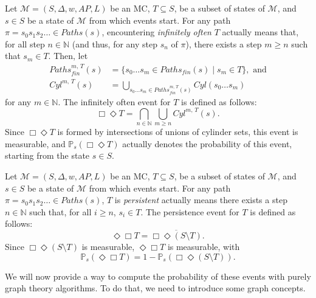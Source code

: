 \begin{definition}
  Let $\mathcal{M}=(S, \Delta, w, AP, L)$ be an MC, $T \subseteq S$, be a subset of states of $\mathcal{M}$, and
  $s \in S$ be a state of $\mathcal{M}$ from which events start. For any path $\pi = s_0 s_1 s_2 \dots \in Paths(s)$,
encountering \textit{infinitely often} $T$ actually means that, for all step $n \in \mathbb{N}$ (and thus, for any step $s_n$ of $\pi$), there exists a step $m \geq n$ such that $s_m \in T$. Then, let
  \begin{align*}
    Paths_{fin}^{m,\, T}(s) &= \{ s_0\dots s_m \in Paths_{fin}(s) \; | \; s_m \in T \}, \text{ and} \\
    Cyl^{m,\, T}(s) &= \bigcup_{s_0 \dots s_m \in Paths_{fin}^{m, \, T}(s)} Cyl(s_0\dots s_m)
  \end{align*}
  for any $m \in \mathbb{N}$. The infinitely often event for $T$ is defined as follows:
  \[
    \Box \Diamond T = \bigcap_{n \in \mathbb{N}} \bigcup_{m \geq n} Cyl^{m, \, T}(s).
  \]
  Since $\Box \Diamond T$ is formed by intersections of unions of cylinder sets, this event is measurable, and $\mathbb{P}_s(\Box\Diamond T)$ actually denotes the probability of this event, starting from the state $s \in S$.
\end{definition}

\begin{definition}
  Let $\mathcal{M}=(S, \Delta, w, AP, L)$ be an MC, $T \subseteq S$, be a subset of states of $\mathcal{M}$, and
  $s \in S$ be a state of $\mathcal{M}$ from which events start. For any path $\pi = s_0 s_1 s_2 \dots \in Paths(s)$,
 $T$ is \textit{persistent} actually means there exists a step $n \in \mathbb{N}$ such that, for all $i\geq n$, $s_i \in T$. The persistence event for $T$ is defined as follows:
 \[
  \Diamond \Box T = \overline{\Box \Diamond (S \setminus T)}.
 \]
 Since $\Box \Diamond (S \setminus T)$ is measurable, $\Diamond \Box T$ is measurable, with \[\mathbb{P}_s(\Diamond \Box T) = 1 - \mathbb{P}_s(\Box \Diamond (S \setminus T)).\]
\end{definition}
We will now provide a way to compute the probability of these events with purely graph theory algorithms. To do that, we need to introduce some graph concepts.

